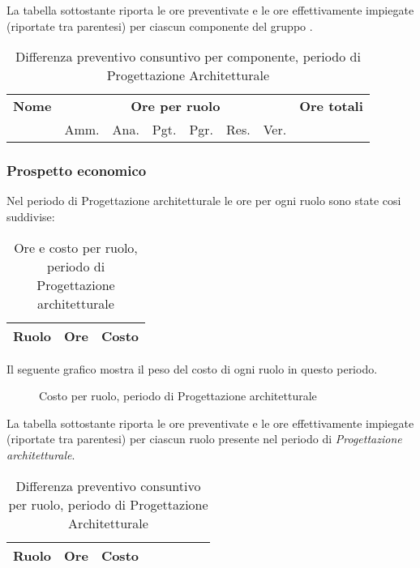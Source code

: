 	La tabella sottostante riporta le ore preventivate e le ore effettivamente impiegate (riportate tra parentesi) per ciascun componente del gruppo \GroupName{}.

	\begin{center}
	\begin{table}[H]
	\begin{tabular}{lccccccc}
	\toprule
	    \textbf{Nome}  & \multicolumn{6}{c}{\textbf{Ore per ruolo}} & \textbf{Ore totali} \\
	     & Amm. & Ana. & Pgt. & Pgr. & Res. & Ver. & \\
	    \midrule
	    
	    \bottomrule
	\end{tabular}
	\caption{Differenza preventivo consuntivo per componente, periodo di Progettazione Architetturale}
	\end{table}
	\end{center}


	\subsubsection{Prospetto economico}

	Nel periodo di Progettazione architetturale le ore per ogni ruolo sono state cosi suddivise:

	\begin{table}[H]
	\centering
	\begin{tabular}{ l c c }
		\textbf{Ruolo} & \textbf{Ore} & \textbf{Costo} \\
		\hline
		
	\end{tabular}
	\caption{Ore e costo per ruolo, periodo di Progettazione architetturale}
	\end{table}

	Il seguente grafico mostra il peso del costo di ogni ruolo in questo periodo.

	\begin{figure}[H]
	\begin{tikzpicture}
		
	\end{tikzpicture}
	\caption{Costo per ruolo, periodo di Progettazione architetturale}
	\end{figure}

	La tabella sottostante riporta le ore preventivate e le ore effettivamente impiegate (riportate tra parentesi) per ciascun ruolo presente nel periodo di \textit{Progettazione architetturale}.

	\begin{table}[H]
	\centering
	\begin{tabular}{lccccccc}
	\toprule
	    \textbf{Ruolo}  & \textbf{Ore} & \textbf{Costo} \\
	    \midrule
	    
	    \bottomrule
	\end{tabular}
	\caption{Differenza preventivo consuntivo per ruolo, periodo di Progettazione Architetturale}
	\end{table}

